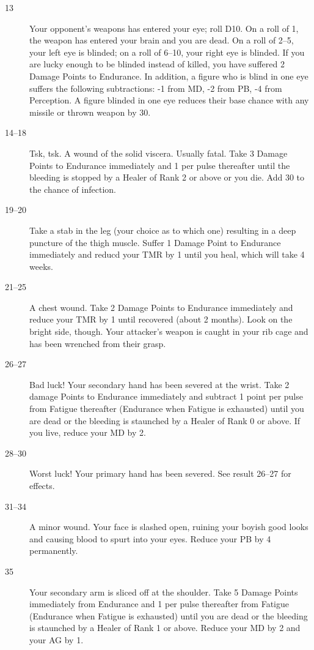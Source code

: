\begin{multicols}{3}
{\begin{description}
\item[13] Your opponent's weapons has entered your eye; roll D10.  On
a roll of 1, the weapon has entered your brain and you are dead.  On a
roll of 2--5, your left eye is blinded; on a roll of 6--10, your right
eye is blinded.  If you are lucky enough to be blinded instead of
killed, you have suffered 2 Damage Points to Endurance.  In addition,
a figure who is blind in one eye suffers the following subtractions:
-1 from MD, -2 from PB, -4 from Perception.  A figure blinded in one
eye reduces their base chance with any missile or thrown weapon by 30.

\item[14--18] Tsk, tsk.  A wound of the solid viscera.  Usually
fatal.  Take 3 Damage Points to Endurance immediately and 1 per pulse
thereafter until the bleeding is stopped by a Healer of Rank 2 or
above or you die.  Add 30 to the chance of infection.

\item[19--20] Take a stab in the leg (your choice as to which one)
resulting in a deep puncture of the thigh muscle.  Suffer 1 Damage
Point to Endurance immediately and reducd your TMR by 1 until you heal,
which will take 4 weeks.

\item[21--25] A chest wound.  Take 2 Damage Points to Endurance
immediately and reduce your TMR by 1 until recovered (about 2
months).  Look on the bright side, though.  Your attacker's weapon is
caught in your rib cage and has been wrenched from their grasp.

\item[26--27] Bad luck!  Your secondary hand has been severed at the
wrist.  Take 2 damage Points to Endurance immediately and subtract 1
point per pulse from Fatigue thereafter (Endurance when Fatigue is
exhausted) until you are dead or the bleeding is staunched by a Healer
of Rank 0 or above.   If you live, reduce your MD by 2.

\item[28--30] Worst luck!  Your primary hand has been severed.  See
result 26--27 for effects.

\item[31--34] A minor wound.  Your face is slashed open, ruining your
boyish good looks and causing blood to spurt into your eyes.  Reduce
your PB by 4 permanently.

\item[35] Your secondary arm is sliced off at the shoulder.  Take 5
Damage Points immediately from Endurance and 1 per pulse thereafter
from Fatigue (Endurance when Fatigue is exhausted) until you are dead
or the bleeding is staunched by a Healer of Rank 1 or above.  Reduce
your MD by 2 and your AG by 1.


\end{description}}
\end{multicols}
